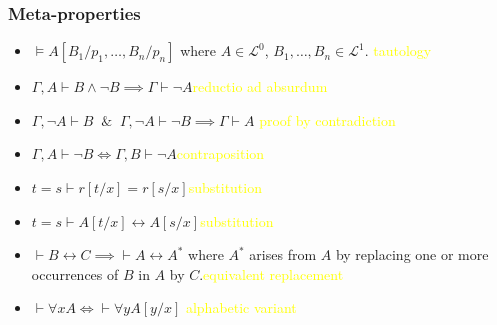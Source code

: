 \documentclass[UTF8,11pt,colorlinks,compress,openany]{beamer}%
\begin{document}
\begin{frame}\frametitle{Meta-properties}
	\begin{itemize}
		\item $\vDash A[B_1/p_1,\dots, B_n/p_n]$ where $A\in\mathscr{L}^0$, $B_1,\dots, B_n\in\mathscr{L}^1$. \hfill \textcolor{yellow}{tautology}
		\item $\Gamma, A\vdash B\wedge\neg B\implies\Gamma\vdash\neg A$\hfill\textcolor{yellow}{reductio ad absurdum}
		\item $\Gamma,\neg A\vdash B\;\;\&\;\;\Gamma,\neg A\vdash\neg B\implies\Gamma\vdash A$ \hfill \textcolor{yellow}{proof by contradiction}
		\item $\Gamma, A\vdash\neg B\iff\Gamma, B\vdash\neg A$\hfill\textcolor{yellow}{contraposition}
		\item $t=s\vdash r[t/x]=r[s/x]$\hfill\textcolor{yellow}{substitution}
		\item $t=s\vdash A[t/x]\leftrightarrow A[s/x]$\hfill\textcolor{yellow}{substitution}
		\item $\vdash B\leftrightarrow C\implies\vdash A\leftrightarrow A^*$ where $A^*$ arises from $A$ by replacing one or more occurrences of $B$ in $A$ by $C$.\hfill \textcolor{yellow}{equivalent replacement}
		\item $\vdash\forall x A\iff\vdash\forall y A[y/x]$ \hfill \textcolor{yellow}{alphabetic variant}
	\end{itemize}
\end{frame}
\end{document}
